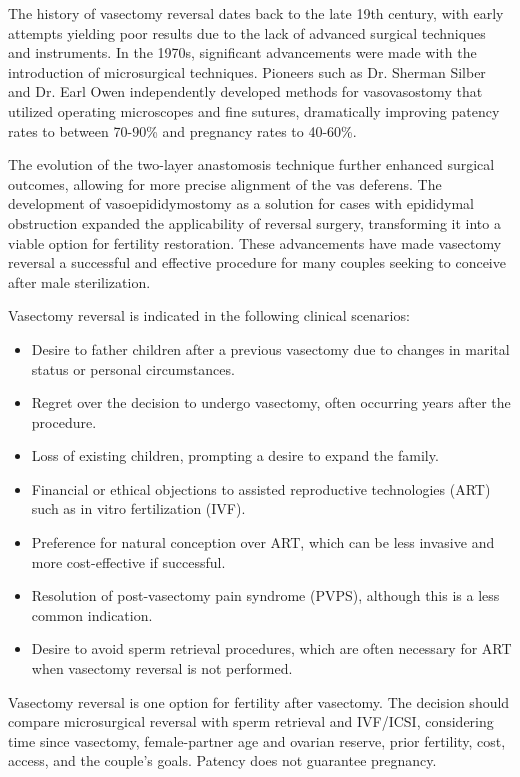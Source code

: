 The history of vasectomy reversal dates back to the late 19th century, with early attempts yielding poor results due to the lack of advanced surgical techniques and instruments. In the 1970s, significant advancements were made with the introduction of microsurgical techniques. Pioneers such as Dr. Sherman Silber and Dr. Earl Owen independently developed methods for vasovasostomy that utilized operating microscopes and fine sutures, dramatically improving patency rates to between 70-90\% and pregnancy rates to 40-60\%. 

The evolution of the two-layer anastomosis technique further enhanced surgical outcomes, allowing for more precise alignment of the vas deferens. The development of vasoepididymostomy as a solution for cases with epididymal obstruction expanded the applicability of reversal surgery, transforming it into a viable option for fertility restoration. These advancements have made vasectomy reversal a successful and effective procedure for many couples seeking to conceive after male sterilization.

Vasectomy reversal is indicated in the following clinical scenarios:

\begin{itemize}
  \item Desire to father children after a previous vasectomy due to changes in marital status or personal circumstances.
  \item Regret over the decision to undergo vasectomy, often occurring years after the procedure.
  \item Loss of existing children, prompting a desire to expand the family.
  \item Financial or ethical objections to assisted reproductive technologies (ART) such as in vitro fertilization (IVF).
  \item Preference for natural conception over ART, which can be less invasive and more cost-effective if successful.
  \item Resolution of post-vasectomy pain syndrome (PVPS), although this is a less common indication.
  \item Desire to avoid sperm retrieval procedures, which are often necessary for ART when vasectomy reversal is not performed.
\end{itemize}

Vasectomy reversal is one option for fertility after vasectomy. The decision should compare microsurgical reversal with sperm retrieval and IVF/ICSI, considering time since vasectomy, female-partner age and ovarian reserve, prior fertility, cost, access, and the couple's goals. Patency does not guarantee pregnancy.

